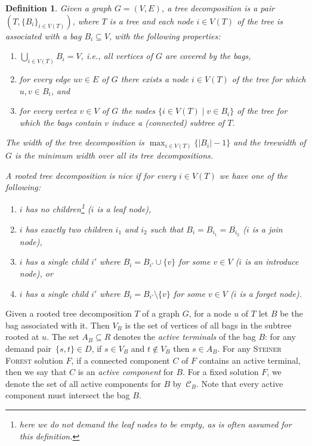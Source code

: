 \documentclass[a4paper]{article}
\theoremstyle{plain}
\newtheorem{definition}[theorem]{Definition}
\newcommand{\mc}[1]{{\mathcal{#1}}}
\newcommand{\pname}[1]{\textsc{#1}}
\newcommand{\SF}{\pname{Steiner Forest}\xspace}
\begin{document}
\begin{definition} Given a graph $G=(V,E)$, a \emph{tree decomposition} is a
pair $(T,\{B_i\}_{i\in V(T)})$, where $T$ is a tree and each node $i\in V(T)$
of the tree is associated with a \emph{bag} $B_i\subseteq V$, with the
following properties: 
\begin{enumerate}
\item $\bigcup_{i\in V(T)} B_i=V$,
i.e., all vertices of $G$ are covered by the bags, 
\item for every edge $uv\in
E$ of $G$ there exists a node $i\in V(T)$ of the tree for which $u,v\in B_i$,
and 
\item for every vertex $v\in V$ of $G$ the nodes $\{i\in V(T)\mid v\in
B_i\}$ of the tree for which the bags contain $v$ induce a (connected) subtree
of $T$.  
\end{enumerate} 
The \emph{width} of the tree decomposition is
$\max_{i\in V(T)}\{|B_i|-1\}$ and the \emph{treewidth} of $G$ is the minimum
width over all its tree decompositions.  

A rooted tree decomposition is \emph{nice} if for every $i\in V(T)$ we have one of the
following: 

\begin{enumerate} 

\item $i$ has no children\footnote{here we do not demand the leaf nodes to be
empty, as is often assumed for this definition.} ($i$ is a \emph{leaf node}),

\item $i$ has exactly two children $i_1$ and $i_2$ such that
$B_i=B_{i_1}=B_{i_2}$ ($i$ is a \emph{join node}), 

\item $i$ has a single child $i'$ where $B_i=B_{i'}\cup \{v\}$ for some $v\in
V$ ($i$ is an \emph{introduce node}), or 

\item $i$ has a single child $i'$ where $B_i=B_{i'}\setminus \{v\}$ for some
$v\in V$ ($i$ is a \emph{forget node}).  

\end{enumerate}

\end{definition}

Given a rooted tree decomposition $T$ of a graph $G$, for a node $u$ of $T$ let
$B$ be the bag associated with it.  Then $V_B$ is the set of vertices of all
bags in the subtree rooted at $u$.  The set $A_B\subseteq R$ denotes the
\emph{active terminals} of the bag $B$: for any demand pair~$\{s,t\}\in D$, if
$s\in V_B$ and $t\notin V_B$ then $s\in A_B$.  For any \SF solution $F$, if a
connected component $C$ of $F$ contains an active terminal, then we say that
$C$ is an \emph{active component} for $B$. For a fixed solution $F$, we denote
the set of all active components for $B$ by~$\mc{C}_B$.  Note that every active
component must intersect the bag $B$. 
\end{document}
